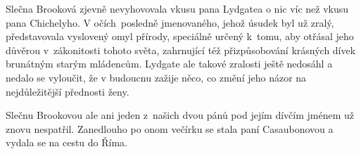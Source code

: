 Slečna Brooková zjevně nevyhovovala vkusu pana Lydgatea o nic víc než vkusu pana Chichelyho. V očích posledně jmenovaného, jehož úsudek byl už zralý, představovala vyslovený omyl přírody, speciálně určený k tomu, aby otřásal jeho důvěrou v zákonitosti tohoto světa, zahrnující též přizpůsobování krásných dívek  brunátným starým mládencům. Lydgate ale takové zralosti ještě nedosáhl a nedalo se vyloučit, že v budoucnu zažije něco, co změní jeho názor na nejdůležitější přednosti ženy.

Slečnu Brookovou ale ani jeden z našich dvou pánů pod jejím dívčím jménem už znovu nespatřil. Zanedlouho po onom večírku se stala paní Casaubonovou a vydala se na cestu do Říma.         


